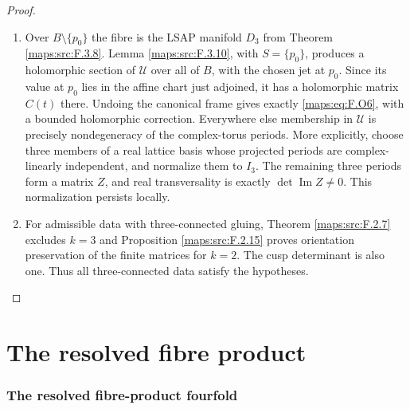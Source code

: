 \documentclass[11pt,a4paper]{article}
\numberwithin{equation}{section}
\theoremstyle{definition}
\begin{document}
\begin{proof}
\begin{enumerate}[label=\arabic*.]
\item Over $B\setminus\{p_0\}$ the fibre is the LSAP manifold
$D_3$ from Theorem \ref{maps:src:F.3.8}.  Lemma \ref{maps:src:F.3.10}, with $S=\{p_0\}$,
produces a holomorphic section of $\mathscr U$ over all of
$B$, with the chosen jet at $p_0$.  Since its value at $p_0$
lies in the affine chart just adjoined, it has a holomorphic
matrix $C(t)$ there.  Undoing the canonical frame gives
exactly \eqref{maps:eq:F.O6}, with a bounded holomorphic correction.
Everywhere else membership in $\mathscr U$ is precisely
nondegeneracy of the complex-torus periods.
More explicitly, choose three members of a real lattice basis
whose projected periods are complex-linearly independent, and
normalize them to $I_3$.  The remaining three periods form a
matrix $Z$, and real transversality is exactly
$\det\operatorname{Im}Z\ne0$.  This normalization persists
locally.  

\item For admissible data with three-connected gluing, Theorem \ref{maps:src:F.2.7} excludes $k=3$ and
Proposition \ref{maps:src:F.2.15} proves orientation preservation of the
finite matrices for $k=2$.  The cusp determinant is also one.
Thus all three-connected data satisfy the hypotheses.  

\end{enumerate}
\end{proof}





\clearpage
\part{The resolved fibre product}\label{pub:V:part-resolved}
\section{The resolved fibre-product fourfold}\label{pub:V:sec-resolved}
\end{document}
